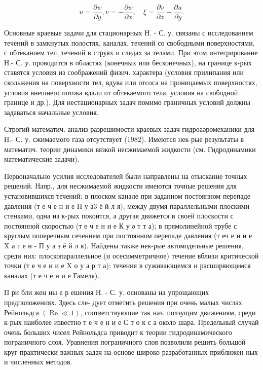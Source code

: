 \documentclass[10pt]{article}
\begin{document}
\[

u=\frac{\partial \psi}{\partial y}, v=-\frac{\partial \psi}{\partial x}, \quad \xi=\frac{\partial v}{\partial x}-\frac{\partial u}{\partial y} .

\]



Основные краевые задачи для стационарных Н. - С. у. связаны с исследованием течений в замкнутых полостях, каналах, течений со свободными поверхностями, с обтеканием тел, течений в струях и следах за телами. При этом интегрирование Н.- С. у. проводится в областях (конечных или бесконечных), на границе к-рых ставятся условия из соображений физич. характера (условия прилипания или скольжения на поверхности тел, вдува или отсоса на проницаемых поверхностях, условия внешнего потока вдали от обтекаемого тела, условия на свободной границе и др.). Для нестационарных задач помимо граничных условий должны задаваться начальные условия.



Строгий математич. анализ разрешимости краевых задач гидроаәромеханики для Н.- С. у. сжимаемого газа отсутствует (1982). Имеются нек-рые результаты в математич. теории динамики вязкой несжимаемой жидкости (см. Гидродинамики математические задачи).



Первоначально усилия исследователей были направлены на отыскание точных решений. Напр., для несжимаемой жидкости имеются точные решения для установившихся течений: в плоском канале при заданном постоянном перепаде давления (т е ч е н и е П у а3 ё й л я); между двумя параллельными плоскими стенками, одна из к-рых покоится, а другая движется в своей плоскости с постоянной скоростью (т е ч е н и е К у ә т т а); в прямолинейной трубе с круглым поперечным сечением при постоянном перепаде давления (т еч е н и е X а г е н - П у а з ё й л я). Найдены также нек-рые автомодельные решения, среди них: плоскопараллельное (и осесимметричное) течение вблизи критической точки (т е ч е н и е X о у а р т а); течения в суживающемся и расширяющемся каналах (т е ч е н и е Гамеля).



П ри бли жен ны е р ешения Н. - С. у. основаны на упрощающих предположениях. Здесь сле- дует отметить решения при очень малых числах Рейнольдса $(\operatorname{Re} \ll 1)$, соответствующие так наз. ползущим движениям, среди к-рых наиболее известно т е ч е н и е С т о к с а около шара. Предельный случай очень больших чисел Рейнольдса приводит к теории гидродинамического пограничного слоя. Уравнения пограничного слоя позволили решить большой круг практически важных задач на основе широко разработанных приближен ных и численных методов.
\end{document}
